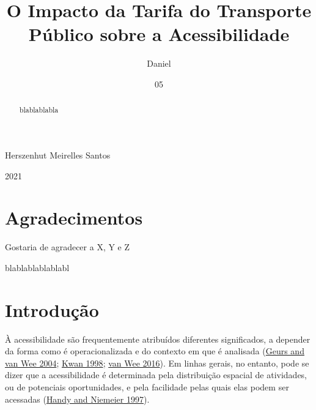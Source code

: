 \documentclass[msc,numbers]{coppe}
\begin{document}
  \title{O Impacto da Tarifa do Transporte Público sobre a Acessibilidade}
    \author{Daniel}{Herszenhut Meirelles Santos}
  

  

  \date{05}{2021}

  
  \maketitle

  \frontmatter
  \dedication{A alguém cujo valor é digno desta dedicatória.}

    \chapter*{Agradecimentos}
  Gostaria de agradecer a X, Y e Z
 \begin{abstract}
blablablabla
 \end{abstract}
  \begin{foreignabstract}
blablablablablabl
  \end{foreignabstract}
  \tableofcontents

  \printlosymbols
  \printloabbreviations

  \mainmatter

  \hypertarget{intro}{%
  \chapter{Introdução}\label{intro}}

  À acessibilidade são frequentemente atribuídos diferentes significados, a depender da forma como é operacionalizada e do contexto em que é analisada (\protect\hyperlink{ref-geurs2004accessibility}{Geurs and van Wee 2004}; \protect\hyperlink{ref-kwan1998spacetime}{Kwan 1998}; \protect\hyperlink{ref-vanwee2016accessible}{van Wee 2016}). Em linhas gerais, no entanto, pode se dizer que a acessibilidade é determinada pela distribuição espacial de atividades, ou de potenciais oportunidades, e pela facilidade pelas quais elas podem ser acessadas (\protect\hyperlink{ref-handy1997measuring}{Handy and Niemeier 1997}).
\end{document}
